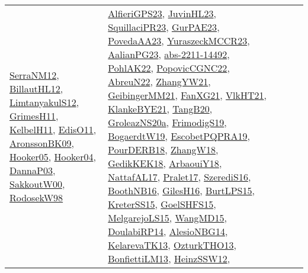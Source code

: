{\begin{longtable}{lp{3cm}>{\raggedright}p{6cm}>{\raggedright}p{6cm}p{8cm}}
\href{papers/SerraNM12.pdf}{SerraNM12}\cite{SerraNM12}, \href{papers/BillautHL12.pdf}{BillautHL12}\cite{BillautHL12}, \href{articles/LimtanyakulS12.pdf}{LimtanyakulS12}\cite{LimtanyakulS12}, \href{papers/GrimesH11.pdf}{GrimesH11}\cite{GrimesH11}, \href{articles/KelbelH11.pdf}{KelbelH11}\cite{KelbelH11}, \href{papers/EdisO11.pdf}{EdisO11}\cite{EdisO11}, \href{papers/AronssonBK09.pdf}{AronssonBK09}\cite{AronssonBK09}, \href{articles/Hooker05.pdf}{Hooker05}\cite{Hooker05}, \href{papers/Hooker04.pdf}{Hooker04}\cite{Hooker04}, \href{papers/DannaP03.pdf}{DannaP03}\cite{DannaP03}, \href{articles/SakkoutW00.pdf}{SakkoutW00}\cite{SakkoutW00}, \href{papers/RodosekW98.pdf}{RodosekW98}\cite{RodosekW98} & \href{articles/AlfieriGPS23.pdf}{AlfieriGPS23}\cite{AlfieriGPS23}, \href{papers/JuvinHL23.pdf}{JuvinHL23}\cite{JuvinHL23}, \href{papers/SquillaciPR23.pdf}{SquillaciPR23}\cite{SquillaciPR23}, \href{articles/GurPAE23.pdf}{GurPAE23}\cite{GurPAE23}, \href{papers/PovedaAA23.pdf}{PovedaAA23}\cite{PovedaAA23}, \href{articles/YuraszeckMCCR23.pdf}{YuraszeckMCCR23}\cite{YuraszeckMCCR23}, \href{papers/AalianPG23.pdf}{AalianPG23}\cite{AalianPG23}, \href{articles/abs-2211-14492.pdf}{abs-2211-14492}\cite{abs-2211-14492}, \href{articles/PohlAK22.pdf}{PohlAK22}\cite{PohlAK22}, \href{papers/PopovicCGNC22.pdf}{PopovicCGNC22}\cite{PopovicCGNC22}, \href{articles/AbreuN22.pdf}{AbreuN22}\cite{AbreuN22}, \href{articles/ZhangYW21.pdf}{ZhangYW21}\cite{ZhangYW21}, \href{papers/GeibingerMM21.pdf}{GeibingerMM21}\cite{GeibingerMM21}, \href{articles/FanXG21.pdf}{FanXG21}\cite{FanXG21}, \href{articles/VlkHT21.pdf}{VlkHT21}\cite{VlkHT21}, \href{papers/KlankeBYE21.pdf}{KlankeBYE21}\cite{KlankeBYE21}, \href{papers/TangB20.pdf}{TangB20}\cite{TangB20}, \href{papers/GroleazNS20a.pdf}{GroleazNS20a}\cite{GroleazNS20a}, \href{papers/FrimodigS19.pdf}{FrimodigS19}\cite{FrimodigS19}, \href{papers/BogaerdtW19.pdf}{BogaerdtW19}\cite{BogaerdtW19}, \href{articles/EscobetPQPRA19.pdf}{EscobetPQPRA19}\cite{EscobetPQPRA19}, \href{articles/PourDERB18.pdf}{PourDERB18}\cite{PourDERB18}, \href{articles/ZhangW18.pdf}{ZhangW18}\cite{ZhangW18}, \href{articles/GedikKEK18.pdf}{GedikKEK18}\cite{GedikKEK18}, \href{papers/ArbaouiY18.pdf}{ArbaouiY18}\cite{ArbaouiY18}, \href{articles/NattafAL17.pdf}{NattafAL17}\cite{NattafAL17}, \href{papers/Pralet17.pdf}{Pralet17}\cite{Pralet17}, \href{papers/SzerediS16.pdf}{SzerediS16}\cite{SzerediS16}, \href{papers/BoothNB16.pdf}{BoothNB16}\cite{BoothNB16}, \href{papers/GilesH16.pdf}{GilesH16}\cite{GilesH16}, \href{papers/BurtLPS15.pdf}{BurtLPS15}\cite{BurtLPS15}, \href{papers/KreterSS15.pdf}{KreterSS15}\cite{KreterSS15}, \href{articles/GoelSHFS15.pdf}{GoelSHFS15}\cite{GoelSHFS15}, \href{papers/MelgarejoLS15.pdf}{MelgarejoLS15}\cite{MelgarejoLS15}, \href{articles/WangMD15.pdf}{WangMD15}\cite{WangMD15}, \href{papers/DoulabiRP14.pdf}{DoulabiRP14}\cite{DoulabiRP14}, \href{papers/AlesioNBG14.pdf}{AlesioNBG14}\cite{AlesioNBG14}, \href{papers/KelarevaTK13.pdf}{KelarevaTK13}\cite{KelarevaTK13}, \href{articles/OzturkTHO13.pdf}{OzturkTHO13}\cite{OzturkTHO13}, \href{papers/BonfiettiLM13.pdf}{BonfiettiLM13}\cite{BonfiettiLM13}, \href{articles/HeinzSSW12.pdf}{HeinzSSW12}\cite{HeinzSSW12}, 
\end{longtable}}
